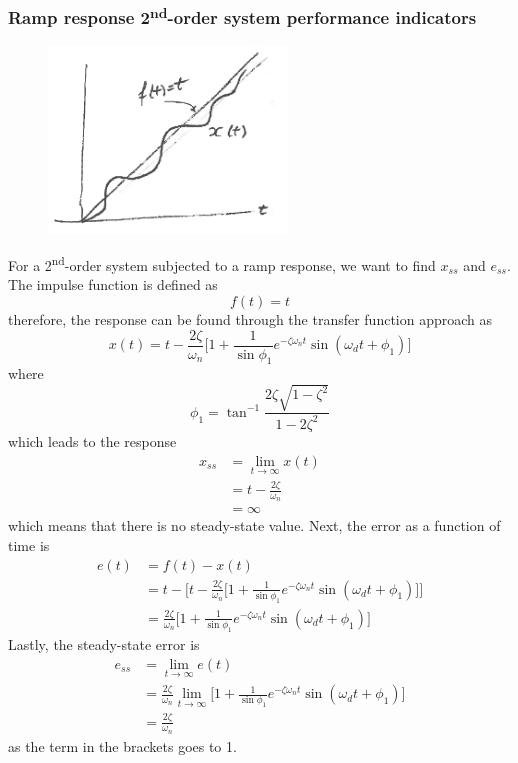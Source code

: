 \documentclass[12pt,letter]{article}
\begin{document}
\subsubsection{Ramp response 2\textsuperscript{nd}-order system performance indicators}

\begin{figure}[H]
	\centering
	\includegraphics[width=2.5in]{../figures/ramp_response_2nd_order_with_steady_state_error}
\end{figure}

For a 2\textsuperscript{nd}-order system subjected to a ramp response, we want to find $x_{ss}$ and $e_{ss}$. The impulse function is defined as
\begin{equation}
f(t) = t
\end{equation}
therefore, the response can be found through the transfer function approach as
\begin{equation}
x(t) = t - \frac{2 \zeta}{\omega_n} \bigg[ 1 + \frac{1}{\sin \phi_1} e^{-\zeta \omega_n t} \sin (\omega_dt + \phi_1) \bigg]
\end{equation}
where
\begin{equation}
\phi_1 = \tan^{-1} \frac{2 \zeta \sqrt{1-\zeta^2}}{1-2 \zeta ^2}
\end{equation}
which leads to the response
\begin{align}
x_{ss} &= \lim\limits_{t \rightarrow \infty} x(t)  \\
&= t - \frac{2 \zeta}{\omega_n} \nonumber \\
&= \infty \nonumber
\end{align}
which means that there is no steady-state value. Next, the error as a function of time is 
\begin{align}
e(t) &= f(t) - x(t) \\
&= t - \Bigg[ t - \frac{2 \zeta}{\omega_n} \bigg[ 1 + \frac{1}{\sin \phi_1} e^{-\zeta \omega_n t} \sin (\omega_dt + \phi_1) \bigg] \Bigg] \nonumber \\
&= \frac{2  \zeta}{\omega_n} \bigg[ 1 + \frac{1}{\sin \phi_1} e^{-\zeta \omega_n t} \sin (\omega_dt + \phi_1) \bigg]  \nonumber 
\end{align}
Lastly, the steady-state error is
\begin{align}
e_{ss} &= \lim\limits_{t \rightarrow \infty}e(t)  \\
&= \frac{2 \zeta}{\omega_n}   \lim\limits_{t \rightarrow \infty} \bigg[ 1 + \frac{1}{\sin \phi_1} e^{-\zeta \omega_n t} \sin (\omega_dt + \phi_1) \bigg]  \nonumber \\
&= \frac{2  \zeta}{\omega_n} \nonumber
\end{align}
as the term in the brackets goes to 1.
\end{document}
